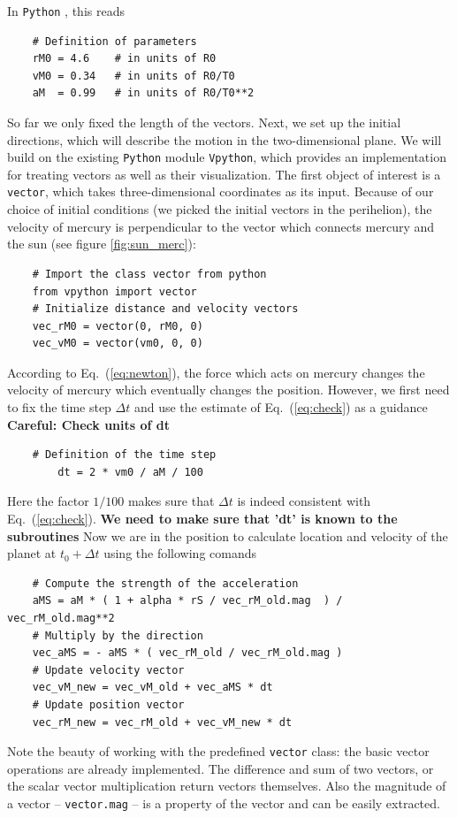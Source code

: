 \documentclass[12pt]{iopart}
\newcommand{\python}[0]{\texttt{Python} }
\begin{document}
In \python, this reads
\begin{lstlisting}
	# Definition of parameters
	rM0 = 4.6    # in units of R0
	vM0 = 0.34   # in units of R0/T0
	aM  = 0.99   # in units of R0/T0**2
\end{lstlisting}
So far we only fixed the length of the vectors.
Next, we set up the initial directions, which will describe the motion in the two-dimensional plane.  We will build on the existing \python module \texttt{Vpython}, which provides  an implementation for treating vectors as well as their visualization.
The first object of interest is a \texttt{vector}, which takes three-dimensional coordinates as its input.  Because of our choice of initial conditions (we picked the initial vectors in the perihelion), the velocity of mercury is perpendicular to the vector which connects mercury and the sun (see figure \ref{fig:sun_merc}):
\begin{lstlisting}
	# Import the class vector from python
	from vpython import vector
	# Initialize distance and velocity vectors
	vec_rM0 = vector(0, rM0, 0)
	vec_vM0 = vector(vm0, 0, 0)
\end{lstlisting}
According to Eq.~(\ref{eq:newton}), the force which acts on mercury changes the velocity of mercury which eventually changes the position. However, we first need to fix the time step $\Delta t$ and use the estimate
of Eq.~(\ref{eq:check}) as a guidance {\bf Careful: Check units of dt}
\begin{lstlisting}
	# Definition of the time step
        dt = 2 * vm0 / aM / 100
\end{lstlisting}
Here the factor $1/100$ makes sure that $\Delta t$ is indeed
consistent with Eq.~(\ref{eq:check}).  {\bf We need to make sure that 'dt' is known
to the subroutines}
Now we are in the position to calculate
location and velocity of the planet at $t_0+\Delta t$ using the following comands
\begin{lstlisting}
	# Compute the strength of the acceleration
	aMS = aM * ( 1 + alpha * rS / vec_rM_old.mag  ) / vec_rM_old.mag**2
	# Multiply by the direction
	vec_aMS = - aMS * ( vec_rM_old / vec_rM_old.mag )
	# Update velocity vector
	vec_vM_new = vec_vM_old + vec_aMS * dt
	# Update position vector
	vec_rM_new = vec_rM_old + vec_vM_new * dt
\end{lstlisting}
Note the beauty of working with the predefined \texttt{vector} class: the basic vector operations are already implemented.  The difference and sum of two vectors, or the scalar vector multiplication return vectors themselves.  Also the magnitude of a vector -- \texttt{vector.mag} -- is a property of the vector and can be easily extracted.
\end{document}
